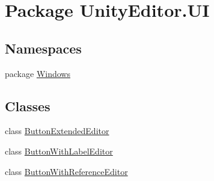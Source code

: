 \hypertarget{namespace_unity_editor_1_1_u_i}{}\section{Package Unity\+Editor.\+U\+I}
\label{namespace_unity_editor_1_1_u_i}
\subsection*{Namespaces}
\begin{DoxyCompactItemize}
\item 
package \hyperlink{namespace_unity_editor_1_1_u_i_1_1_windows}{Windows}
\end{DoxyCompactItemize}
\subsection*{Classes}
\begin{DoxyCompactItemize}
\item 
class \hyperlink{class_unity_editor_1_1_u_i_1_1_button_extended_editor}{Button\+Extended\+Editor}
\item 
class \hyperlink{class_unity_editor_1_1_u_i_1_1_button_with_label_editor}{Button\+With\+Label\+Editor}
\item 
class \hyperlink{class_unity_editor_1_1_u_i_1_1_button_with_reference_editor}{Button\+With\+Reference\+Editor}
\end{DoxyCompactItemize}

